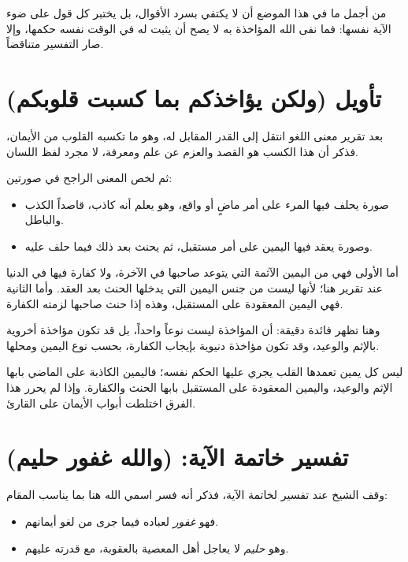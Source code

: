 \begin{fawaid}
من أجمل ما في هذا الموضع أن  لا يكتفي بسرد الأقوال، بل يختبر كل قول على ضوء الآية نفسها: فما نفى الله المؤاخذة به لا يصح أن يثبت له في الوقت نفسه حكمها، وإلا صار التفسير متناقضاً.
\end{fawaid}

\section{تأويل (ولكن يؤاخذكم بما كسبت قلوبكم)}
بعد تقرير معنى اللغو انتقل  إلى القدر المقابل له، وهو ما تكسبه القلوب من الأيمان، فذكر أن هذا الكسب هو القصد والعزم عن علم ومعرفة، لا مجرد لفظ اللسان.

ثم لخص المعنى الراجح في صورتين:
\begin{itemize}
    \item صورة يحلف فيها المرء على أمر ماضٍ أو واقع، وهو يعلم أنه كاذب، قاصداً الكذب والباطل.
    \item وصورة يعقد فيها اليمين على أمر مستقبل، ثم يحنث بعد ذلك فيما حلف عليه.
\end{itemize}

أما الأولى فهي من اليمين الآثمة التي يتوعد صاحبها في الآخرة، ولا كفارة فيها في الدنيا عند تقرير  هنا؛ لأنها ليست من جنس اليمين التي يدخلها الحنث بعد العقد. وأما الثانية فهي اليمين المعقودة على المستقبل، وهذه إذا حنث صاحبها لزمته الكفارة.

وهنا تظهر فائدة دقيقة: أن المؤاخذة ليست نوعاً واحداً، بل قد تكون مؤاخذة أخروية بالإثم والوعيد، وقد تكون مؤاخذة دنيوية بإيجاب الكفارة، بحسب نوع اليمين ومحلها.

\begin{fawaid}
ليس كل يمين تعمدها القلب يجري عليها الحكم نفسه؛ فاليمين الكاذبة على الماضي بابها الإثم والوعيد، واليمين المعقودة على المستقبل بابها الحنث والكفارة. وإذا لم يحرر هذا الفرق اختلطت أبواب الأيمان على القارئ.
\end{fawaid}

\section{تفسير خاتمة الآية: (والله غفور حليم)}
وقف الشيخ عند تفسير  لخاتمة الآية، فذكر أنه فسر اسمي الله هنا بما يناسب المقام:
\begin{itemize}
    \item فهو \textit{غفور} لعباده فيما جرى من لغو أيمانهم.
    \item وهو \textit{حليم} لا يعاجل أهل المعصية بالعقوبة، مع قدرته عليهم.
\end{itemize}

